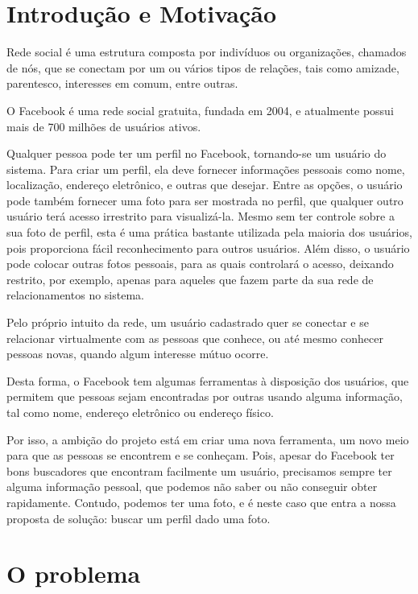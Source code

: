 \documentclass[10pt,a4paper]{article}
\begin{document}
\tableofcontents
\newpage 
\doublespacing

\section{Introdução e Motivação}

	Rede social é uma estrutura composta por indivíduos ou organizações, chamados de nós, que se conectam por um ou vários tipos de relações, tais como amizade, parentesco, interesses em comum, entre outras.
	
	O Facebook é uma rede social gratuita, fundada em 2004, e atualmente possui mais de 700 milhões de usuários ativos.

	Qualquer pessoa pode ter um perfil no Facebook, tornando-se um usuário do sistema. Para criar um perfil, ela deve fornecer informações pessoais como nome, localização, endereço eletrônico, e outras que desejar. Entre as opções, o usuário pode também fornecer uma foto para ser mostrada no perfil, que qualquer outro usuário terá acesso irrestrito para visualizá-la. Mesmo sem ter controle sobre a sua foto de perfil, esta é uma prática bastante utilizada pela maioria dos usuários, pois proporciona fácil reconhecimento para outros usuários. Além disso, o usuário pode colocar outras fotos pessoais, para as quais controlará o acesso, deixando restrito, por exemplo, apenas para aqueles que fazem parte da sua rede de relacionamentos no sistema.

	Pelo próprio intuito da rede, um usuário cadastrado quer se conectar e se relacionar virtualmente com as pessoas que conhece, ou até mesmo conhecer pessoas novas, quando algum interesse mútuo ocorre.

	Desta forma, o Facebook tem algumas ferramentas à disposição dos usuários, que permitem que pessoas sejam encontradas por outras usando alguma informação, tal como nome, endereço eletrônico ou endereço físico.

	Por isso, a ambição do projeto está em criar uma nova ferramenta, um novo meio para que as pessoas se encontrem e se conheçam. Pois, apesar do Facebook ter bons buscadores que encontram facilmente um usuário, precisamos sempre ter alguma informação pessoal, que podemos não saber ou não conseguir obter rapidamente. Contudo, podemos ter uma foto, e é neste caso que entra a nossa proposta de solução: buscar um perfil dado uma foto.
\newpage
\section{O problema}
\end{document}
